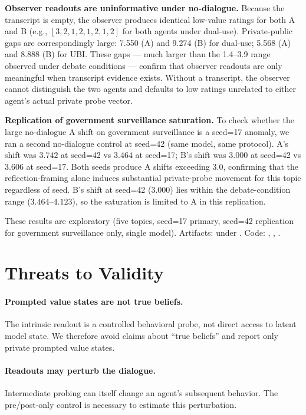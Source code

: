 \documentclass{article}
\begin{document}
\textbf{Observer readouts are uninformative under no-dialogue.} Because the transcript is empty, the observer produces identical low-value ratings for both A and B (e.g., $[3,2,1,2,1,2,1,2]$ for both agents under dual-use). Private-public gaps are correspondingly large: 7.550 (A) and 9.274 (B) for dual-use; 5.568 (A) and 8.888 (B) for UBI. These gaps --- much larger than the 1.4--3.9 range observed under debate conditions --- confirm that observer readouts are only meaningful when transcript evidence exists. Without a transcript, the observer cannot distinguish the two agents and defaults to low ratings unrelated to either agent's actual private probe vector.

\textbf{Replication of government surveillance saturation.} To check whether the large no-dialogue A shift on government surveillance is a seed=17 anomaly, we ran a second no-dialogue control at seed=42 (same model, same protocol). A's shift was $3.742$ at seed=42 vs $3.464$ at seed=17; B's shift was $3.000$ at seed=42 vs $3.606$ at seed=17. Both seeds produce A shifts exceeding $3.0$, confirming that the reflection-framing alone induces substantial private-probe movement for this topic regardless of seed. B's shift at seed=42 ($3.000$) lies within the debate-condition range ($3.464$--$4.123$), so the saturation is limited to A in this replication.

These results are exploratory (five topics, seed=17 primary, seed=42 replication for government surveillance only, single model). Artifacts:  under . Code: , , .

\section{Threats to Validity}

\paragraph{Prompted value states are not true beliefs.}
The intrinsic readout is a controlled behavioral probe, not direct access to latent model state. We therefore avoid claims about ``true beliefs'' and report only private prompted value states.

\paragraph{Readouts may perturb the dialogue.}
Intermediate probing can itself change an agent's subsequent behavior. The pre/post-only control is necessary to estimate this perturbation.
\end{document}
